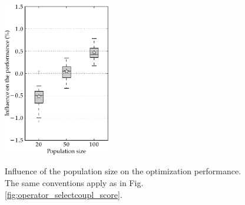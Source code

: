 \documentclass{ametsoc}
\begin{document}
\begin{figure}[t]
	\begin{center}
		\noindent\includegraphics[width=11pc,angle=0]{fig15.pdf}\\
	\end{center}
	\caption{Influence of the population size on the optimization performance. The same conventions apply as in Fig. \ref{fig:operator_selectcoupl_score}.}
	\label{fig:option_taillepop_score}
\end{figure}
\end{document}
